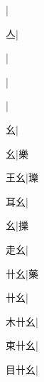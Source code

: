 \begin{multicols}{2}
{{\cjk{}{\cnsym{}　}{\cnsym{}　}{\cnsym{}　}}|{}\par
{\cjk{}{\cnsym{}　}{\cnsym{}　}亼}|{}\par
{\cjk{}{\cnsym{}　}{\cnsym{}　}{\cnsym{}　}}|{}\par
{\cjk{}{\cnsym{}　}{\cnsym{}　}{\cnsym{}　}}|{}\par
{\cjk{}{\cnsym{}　}{\cnsym{}　}{\cnsym{}　}}|{}\par
{\cjk{}{\cnsym{}　}{\cnsym{}　}幺}|{}\par
{\cjk{}{\cnsym{}　}{\cnsym{}　}幺}|{\cjk{}樂}\par
{\cjk{}{\cnsym{}　}王幺}|{\cjk{}瓅}\par
{\cjk{}{\cnsym{}　}耳幺}|{}\par
{幺}|{\cjk{}擽}\par
{\cjk{}{\cnsym{}　}走幺}|{}\par
{\cjk{}{\cnsym{}　}卄幺}|{\cjk{}藥}\par
{卄幺}|{}\par
{\cjk{}木卄幺}|{}\par
{\cjk{}束卄幺}|{}\par
{\cjk{}目卄幺}|{}\par
}
\end{multicols}
